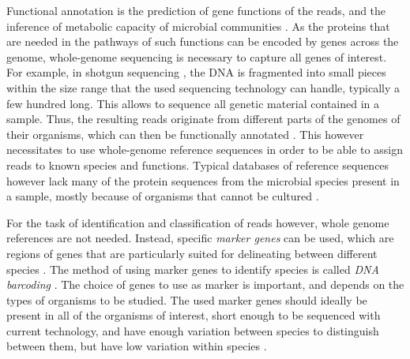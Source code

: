 Functional annotation \cite{Stein2001} is the prediction of gene functions of the reads,
and the inference of metabolic capacity of microbial communities \cite{Brown2017}.
As the proteins that are needed in the pathways of such functions can be encoded by genes across the genome,
whole-genome sequencing is necessary to capture all genes of interest.
For example, in shotgun sequencing \cite{Staden1979,Anderson1981},
the DNA is fragmented into small pieces within the size range that the used sequencing technology can handle,
typically a few hundred \si{\basepair} long.
This allows to sequence all genetic material contained in a sample.
Thus, the resulting reads originate from different parts of the genomes of their organisms,
which can then be functionally annotated \cite{Glass2010}.
This however necessitates to use whole-genome reference sequences
in order to be able to assign reads to known species and functions.
Typical databases of reference sequences however
lack many of the protein sequences from the microbial species present in a sample,
mostly because of organisms that cannot be cultured \cite{Brown2017}.

For the task of identification and classification of reads however, whole genome references are not needed.
Instead, specific \emph{marker genes} can be used,
which are regions of genes that are particularly suited for delineating between different species \cite{Ren2016}.
The method of using marker genes to identify species is called \emph{DNA barcoding} \cite{Hebert2003,Savolainen2005,Deiner2017b}.
The choice of genes to use as marker is important, and depends on the types of organisms to be studied.
The used marker genes should ideally be present in all of the organisms of interest,
short enough to be sequenced with current technology,
and have enough variation between species to distinguish between them,
but have low variation within species \cite{Kress2008}.


